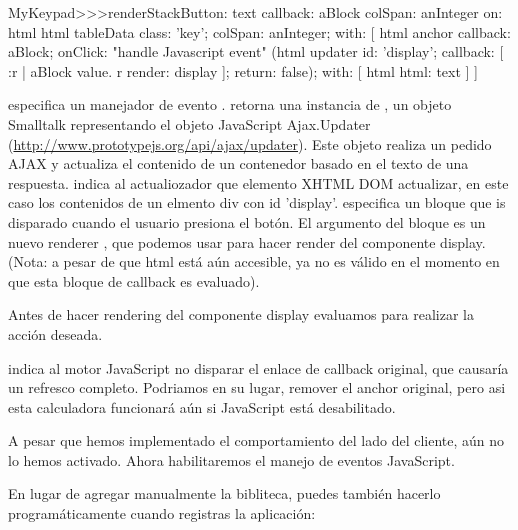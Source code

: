 \documentclass[a4paper,10pt,twoside]{book}
\begin{document}
\begin{code}{}
MyKeypad>>>renderStackButton: text callback: aBlock colSpan: anInteger on: html 
	html tableData
		class: 'key';
		colSpan: anInteger;
		with: [
			html anchor
				callback: aBlock;
				onClick:				"handle Javascript event"
					(html updater
						id: 'display';
						callback: [ :r |
							aBlock value.
							r render: display ];
						return: false);
				with: [ html html: text ] ]
\end{code}

 especifica un manejador de evento .
 retorna una instancia de , un objeto Smalltalk representando el objeto JavaScript Ajax.Updater (\url{http://www.prototypejs.org/api/ajax/updater}).
Este objeto realiza un pedido AJAX y actualiza el contenido de un contenedor basado en el texto de una respuesta.
 indica al actualiozador que elemento XHTML DOM actualizar, en este caso los contenidos de un elmento div con id 'display'.
 especifica un bloque que is disparado cuando el usuario presiona el bot\'on.
El argumento del bloque es un nuevo renderer , que podemos usar para hacer render del componente display.
(Nota: a pesar de que html est\'a a\'un accesible, ya no es v\'alido en el momento en que esta bloque de callback es evaluado).

Antes de hacer rendering del componente display evaluamos  para realizar la acci\'on deseada.

 indica al motor JavaScript no disparar el enlace de callback original, que causar\'ia un refresco completo.
Podriamos en su lugar, remover el anchor  original, pero asi esta calculadora funcionar\'a a\'un si JavaScript est\'a desabilitado. 


A pesar que hemos implementado el comportamiento del lado del cliente, a\'un no lo hemos activado.
Ahora habilitaremos el manejo de eventos JavaScript.


En lugar de agregar manualmente la bibliteca, puedes tambi\'en hacerlo program\'aticamente cuando registras la aplicaci\'on:
\begin{code}{}
MyCalculator class>>>initialize
	(self registerAsApplication: 'rpn')
		addLibrary: SULibrary}}
\end{code}
\end{document}
